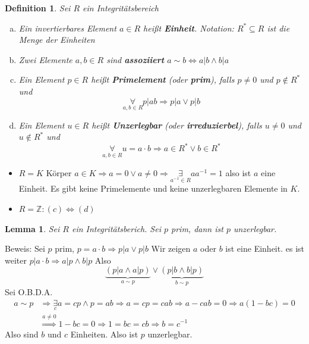 \documentclass{article}
\newtheorem{defi}[thm]{Definition}
\newtheorem{lemma}[thm]{Lemma}
\newcommand{\Z}{\mathbb{Z}}
\begin{document}
\begin{defi}
    Sei $R$ ein Integritätsbereich
    \begin{enumerate}[(a)]
        \item
            Ein invertierbares Element $a\in R$ heißt
            \textbf{Einheit}. Notation: $R^*\subseteq R$
            ist die Menge der Einheiten
        \item
            Zwei Elemente $a,b\in R$ sind
            \textbf{assoziiert}
            $a\sim b\Leftrightarrow a|b\land b|a$
        \item
            Ein Element $p\in R$ heißt \textbf{Primelement}
            (oder \textbf{prim}), falls $p\neq 0$ und
            $p\notin R^*$ und
            \begin{equation*}
                \underset{a,b\in R}\forall
                p|ab\Rightarrow p|a\lor p|b
            \end{equation*}
        \item
            Ein Element $u\in R$ heißt \textbf{Unzerlegbar}
            (oder \textbf{irreduzierbel}), falls $u\neq 0$
            und $u\notin R^*$ und
            \begin{equation*}
                \underset{a,b\in R}\forall u=a\cdot b
                \Rightarrow a\in R^*\lor b\in R^*
            \end{equation*}
    \end{enumerate}
\end{defi}
\color{purple}
\begin{itemize}
    \item
        $R=K$ Körper $a\in K\Rightarrow a=0\lor a\neq 0
        \Rightarrow\underset{a^{-1}\in R}\exists aa^{-1}=1$
        also ist $a$ eine Einheit. Es gibt keine
        Primelemente und keine unzerlegbaren Elemente in $K$.
    \item
        $R=\Z:(c)\Leftrightarrow(d)$
\end{itemize}
\color{black}
\begin{lemma}
    Sei $R$ ein Integritätsberich. Sei $p$ prim, dann
    ist $p$ unzerlegbar.
\end{lemma}
Beweis: Sei $p$ prim, $p=a\cdot b\Rightarrow p|a\lor p|b$
Wir zeigen $a$ oder $b$ ist eine Einheit.
es ist weiter $p|a\cdot b\Rightarrow a|p\land b|p$
Also
\begin{equation*}
    \underbrace{(p|a\land a|p)}_{a\sim p}\lor
    \underbrace{(p|b\land b|p)}_{b\sim p}
\end{equation*}
Sei O.B.D.A.
\begin{align*}
    a\sim p&\Rightarrow\underset{c}\exists a=cp\land p=ab
    \Rightarrow a=cp=cab\Rightarrow a-cab=0
    \Rightarrow a(1-bc)=0\\
    &\overset{a\neq 0}\Rightarrow 1-bc=0
    \Rightarrow 1=bc=cb \Rightarrow b=c^{-1}
\end{align*}
Also sind $b$ und $c$ Einheiten. Also ist $p$ unzerlegbar.
\end{document}
